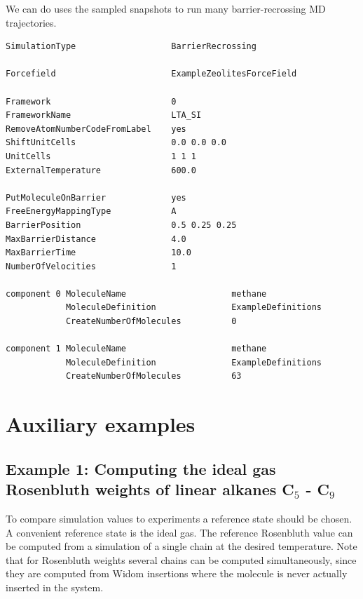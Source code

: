 We can do uses the sampled snapshots to run many barrier-recrossing MD trajectories.
\begin{small}
\begin{verbatim}
SimulationType                   BarrierRecrossing
  
Forcefield                       ExampleZeolitesForceField

Framework                        0
FrameworkName                    LTA_SI
RemoveAtomNumberCodeFromLabel    yes
ShiftUnitCells                   0.0 0.0 0.0
UnitCells                        1 1 1
ExternalTemperature              600.0

PutMoleculeOnBarrier             yes
FreeEnergyMappingType            A
BarrierPosition                  0.5 0.25 0.25
MaxBarrierDistance               4.0
MaxBarrierTime                   10.0
NumberOfVelocities               1

component 0 MoleculeName                     methane
            MoleculeDefinition               ExampleDefinitions
            CreateNumberOfMolecules          0

component 1 MoleculeName                     methane
            MoleculeDefinition               ExampleDefinitions
            CreateNumberOfMolecules          63
\end{verbatim}
\end{small}

\section{Auxiliary examples}

\subsection*{Example 1: Computing the ideal gas Rosenbluth weights of linear alkanes C$_5$ - C$_9$}

To compare simulation values to experiments a reference state should be chosen. A convenient reference state
is the ideal gas. The reference Rosenbluth value can be computed from a simulation of a single chain at the
desired temperature. Note that for Rosenbluth weights several chains can be computed simultaneously, since
they are computed from Widom insertions where the molecule is never actually inserted in the system.

